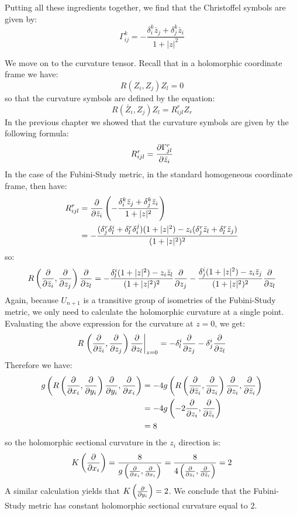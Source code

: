 %
Putting all these ingredients together, we find that the Christoffel symbols are given by:
%
$$ \Gamma^k_{ij} = - \frac{ \delta^k_i \bar{z}_j + \delta^k_j \bar{z}_i }{ 1 + |z|^2 } $$


We move on to the curvature tensor.  Recall that in a holomorphic coordinate frame we have:
%
$$ R(Z_i, Z_j)Z_l = 0$$
%
so that the curvature symbols are defined by the equation:
%
$$ R( \bar{Z}_i, Z_j )Z_l = R_{ijl}^r Z_r $$
%
In the previous chapter we showed that the curvature symbols are given by the following formula:
%
$$ R_{ijl}^r = \frac{ \partial \Gamma_{jl}^r }{ \partial \bar{z}_i } $$
%
In the case of the Fubini-Study metric, in the standard homogeneous coordinate frame, then have:
%
\begin{align*}
R_{ijl}^r &= \frac{\partial}{\partial \bar{z}_i } \left( - \frac{ \delta^k_i \bar{z}_j + \delta^k_j \bar{z}_i }{ 1 + |z|^2 } \right) \\
&= - \frac{ (\delta^r_j \delta^i_l + \delta^r_l \delta^j_i)( 1 + |z|^2 ) - z_i ( \delta^r_j \bar{z}_l + \delta^r_l \bar{z}_j ) }{ (1 + |z|^2)^2 } 
\end{align*}
%
so:
%
$$ R \left( \frac{ \partial }{ \partial \bar{z}_i }, \frac{ \partial }{ \partial z_j } \right) \frac{ \partial }{ \partial z_l } = - \frac{ \delta^i_l (1 + |z|^2) - z_i \bar{z}_l }{ (1 + |z|^2)^2 } \frac{ \partial }{ \partial z_j } - \frac{ \delta^i_j (1 + |z|^2) - z_i \bar{z}_j }{ (1 + |z|^2)^2 } \frac{ \partial }{ \partial z_l } $$
%
Again, because $U_{n+1}$ is a transitive group of isometries of the Fubini-Study metric, we only need to calculate the holomorphic curvature at a single point.  Evaluating the above expression for the curvature at $z=0$, we get:
%
$$ R \left. \left( \frac{ \partial }{ \partial \bar{z}_i }, \frac{ \partial }{ \partial z_j } \right) \frac{ \partial }{ \partial z_l } \right|_{z=0} = - \delta^i_l \frac{ \partial }{ \partial z_j } - \delta^i_j \frac{ \partial }{ \partial z_l }$$
%
Therefore we have:
%
\begin{align*} g \left( R \left( \frac{ \partial }{ \partial x_i }, \frac{ \partial }{ \partial y_i } \right) \frac{ \partial }{ \partial y_i }, \frac{ \partial }{ \partial x_i } \right) &= - 4 g \left( R \left( \frac{ \partial }{ \partial \bar{z}_i }, \frac{ \partial }{ \partial z_i } \right) \frac{ \partial }{ \partial z_i }, \frac{ \partial }{ \partial \bar{z}_i } \right) \\
&= -4 g \left( - 2 \frac{ \partial }{ \partial z_i}, \frac{ \partial }{ \partial \bar{z}_i } \right) \\
&= 8 
\end{align*}
%
so the holomorphic sectional curvature in the $z_i$ direction is:
%
$$ K \left( \frac{ \partial }{ \partial x_i } \right) = \frac{8}{ g \left( \frac{ \partial }{ \partial x_i }, \frac{ \partial }{ \partial x_i } \right) } = \frac{8}{4 \left( \frac{ \partial }{ \partial z_i }, \frac{ \partial }{ \partial \bar{z}_i } \right) } = 2 $$
%
A similar calculation yields that $K \left( \frac{ \partial }{ \partial y_i } \right) = 2$.  We conclude that the Fubini-Study metric has constant holomorphic sectional curvature equal to $2$.
%

